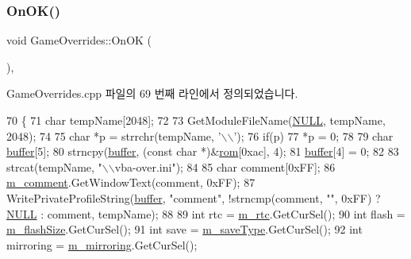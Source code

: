 \subsubsection{\texorpdfstring{On\+O\+K()}{OnOK()}}
{\footnotesize\ttfamily void Game\+Overrides\+::\+On\+OK (\begin{DoxyParamCaption}{ }\end{DoxyParamCaption})\hspace{0.3cm}{\ttfamily [protected]}, {\ttfamily [virtual]}}



Game\+Overrides.\+cpp 파일의 69 번째 라인에서 정의되었습니다.


\begin{DoxyCode}
70 \{
71   \textcolor{keywordtype}{char} tempName[2048];
72   
73   GetModuleFileName(\mbox{\hyperlink{getopt1_8c_a070d2ce7b6bb7e5c05602aa8c308d0c4}{NULL}}, tempName, 2048);
74   
75   \textcolor{keywordtype}{char} *p = strrchr(tempName, \textcolor{charliteral}{'\(\backslash\)\(\backslash\)'});
76   \textcolor{keywordflow}{if}(p)
77     *p = 0;
78   
79   \textcolor{keywordtype}{char} \mbox{\hyperlink{_g_b_a_8cpp_a28d4d3d8445e73a696b2d6f7eadabd96}{buffer}}[5];
80   strncpy(\mbox{\hyperlink{_g_b_a_8cpp_a28d4d3d8445e73a696b2d6f7eadabd96}{buffer}}, (\textcolor{keyword}{const} \textcolor{keywordtype}{char} *)&\mbox{\hyperlink{_globals_8cpp_adafc6ed627110c42f3893c9783f55320}{rom}}[0xac], 4);
81   \mbox{\hyperlink{_g_b_a_8cpp_a28d4d3d8445e73a696b2d6f7eadabd96}{buffer}}[4] = 0;
82   
83   strcat(tempName, \textcolor{stringliteral}{"\(\backslash\)\(\backslash\)vba-over.ini"});
84 
85   \textcolor{keywordtype}{char} comment[0xFF];
86   \mbox{\hyperlink{class_game_overrides_a8fda5a63d4695c79b4bb430717a01daa}{m\_comment}}.GetWindowText(comment, 0xFF);
87   WritePrivateProfileString(\mbox{\hyperlink{_g_b_a_8cpp_a28d4d3d8445e73a696b2d6f7eadabd96}{buffer}}, \textcolor{stringliteral}{"comment"}, !strncmp(comment, \textcolor{stringliteral}{""}, 0xFF) ? 
      \mbox{\hyperlink{getopt1_8c_a070d2ce7b6bb7e5c05602aa8c308d0c4}{NULL}} : comment, tempName);
88 
89   \textcolor{keywordtype}{int} rtc = \mbox{\hyperlink{class_game_overrides_a68ff1f6bae098f28c5f7a30b90141781}{m\_rtc}}.GetCurSel();
90   \textcolor{keywordtype}{int} flash = \mbox{\hyperlink{class_game_overrides_a3f75d6a84d709bc9052eae826ae4b1c3}{m\_flashSize}}.GetCurSel();
91   \textcolor{keywordtype}{int} save = \mbox{\hyperlink{class_game_overrides_ac56384b1ec6d9198db961d3d88e5bbc7}{m\_saveType}}.GetCurSel();
92   \textcolor{keywordtype}{int} mirroring = \mbox{\hyperlink{class_game_overrides_a3aeea798546add267de2b8a59b4d6e0e}{m\_mirroring}}.GetCurSel();

\end{DoxyCode}
